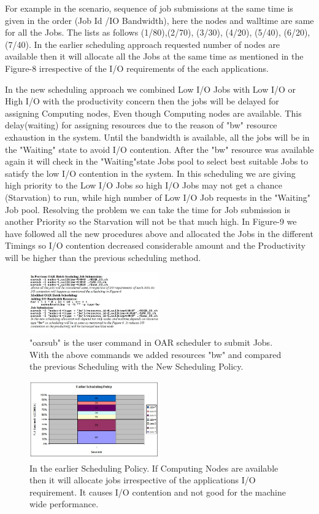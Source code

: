 \documentclass{article}
\begin{document}
For example in the scenario, sequence of job submissions at the same time is given in the order (Job Id \slash IO Bandwidth), here the nodes and walltime are same for all the Jobs. The lists as follows
(1/80),(2/70), (3/30), (4/20), (5/40), (6/20), (7/40). In the earlier scheduling approach requested number of nodes are available then it will allocate all the Jobs at the same time as mentioned in the Figure-8 irrespective of the I/O requirements of the each applications.


In the new scheduling approach we combined Low I/O Jobs with Low I/O or High I/O with the productivity concern then the jobs will be delayed for assigning Computing nodes, Even though Computing nodes are available. This delay(waiting) for assigning resources due to the reason of "bw" resource exhaustion in the system. Until the bandwidth is available, all the jobs will be in the "Waiting" state to avoid I/O contention. After the "bw" resource was available again it will check in the "Waiting"state Jobs pool to select best suitable Jobs to satisfy the low I/O contention in the system. In this scheduling we are giving high priority to the Low I/O Jobs so high I/O Jobs may not get a chance (Starvation) to run, while high number of Low I/O Job requests in the "Waiting" Job pool. Resolving the problem we can take the time for Job submission is another Priority so the Starvation will not be that much high. In Figure-9 we have followed all the new procedures above and allocated the Jobs in the different Timings so I/O contention decreased considerable amount and the Productivity will be higher than the previous scheduling method.
\newline
\begin{figure}
  \centering    
      \includegraphics[width=0.5\textwidth]{Commands.jpg}
  \caption{ "oarsub" is the user command in OAR scheduler to submit Jobs. With the above commands we added resources "bw" and compared the previous Scheduling with the New Scheduling Policy. }
\end{figure}
\newline
\begin{figure}
  \centering    
      \includegraphics[width=0.5\textwidth]{Theoretical-Earlier-Scheduling.jpg}
  \caption{In the earlier Scheduling Policy. If Computing Nodes are available then it will allocate jobs irrespective of the applications I/O requirement. It causes I/O contention and not good for the machine wide performance. }
\end{figure}
\end{document}
